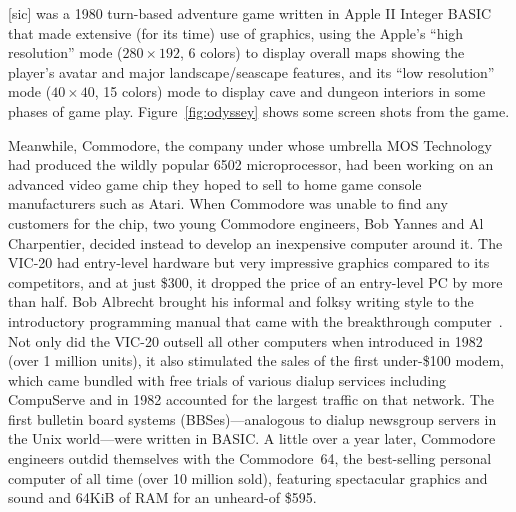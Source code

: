  [sic] was a 1980 turn-based adventure game
written in Apple II Integer BASIC
that made extensive (for its time) use of
graphics, using the Apple's ``high resolution'' mode ($280\times 192$, 6 colors)
to display overall maps showing the player's
avatar and major landscape/seascape features, and its
``low resolution'' mode ($40\times 40$, 15
colors) mode to display cave and dungeon interiors in some phases of game play.
Figure~\ref{fig:odyssey} shows some screen shots from the game.


Meanwhile, Commodore, the company under whose umbrella MOS Technology
had produced the wildly popular 6502 microprocessor, had been working on
an advanced video game chip they hoped to sell to home game console manufacturers
such as Atari.
When Commodore was unable to find any customers for the chip, two young
Commodore engineers, Bob Yannes and Al Charpentier, decided instead to
develop an inexpensive computer around it.
The VIC-20 had entry-level hardware but very impressive graphics
compared to its competitors, and at just \$300, it dropped the price
of an entry-level PC by more than half.
Bob Albrecht brought his informal and folksy writing style to the
introductory programming manual that came with the breakthrough
computer~\cite{commodore}.
Not only did the VIC-20 outsell all other computers when introduced in
1982 (over 1 million units), it also stimulated the sales of the first
under-\$100 modem, which came bundled with free trials of various dialup
services including CompuServe and in 1982 accounted for the largest
traffic on that network.
The first bulletin board systems (BBSes)---analogous to dialup
newsgroup servers in the Unix world---were written in BASIC.
A little over a year later, Commodore engineers outdid themselves with
the Commodore~64, the best-selling personal computer of all time (over
10 million sold), featuring spectacular graphics and sound and 64KiB
of RAM for an unheard-of \$595.

